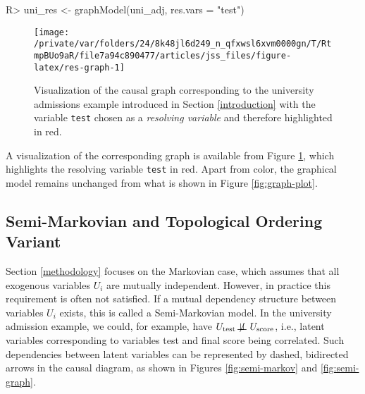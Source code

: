 \documentclass[
  nojss]{jss}
\begin{document}
\begin{CodeChunk}
\begin{CodeInput}
R> uni_res <- graphModel(uni_adj, res.vars = "test")
\end{CodeInput}
\end{CodeChunk}

\begin{CodeChunk}
\begin{figure}

{\centering \texttt{[image: /private/var/folders/24/8k48jl6d249\_n\_qfxwsl6xvm0000gn/T/RtmpBUo9aR/file7a94c890477/articles/jss\_files/figure-latex/res-graph-1]} 

}

\caption[Visualization of the causal graph corresponding to the university admissions example introduced in Section \ref{introduction} with the variable \texttt{test} chosen as a \textit{resolving variable} and therefore highlighted in red]{Visualization of the causal graph corresponding to the university admissions example introduced in Section \ref{introduction} with the variable \texttt{test} chosen as a \textit{resolving variable} and therefore highlighted in red.}\label{fig:res-graph}
\end{figure}
\end{CodeChunk}

A visualization of the corresponding graph is available from Figure
\ref{fig:res-graph}, which highlights the resolving variable
\texttt{test} in red. Apart from color, the graphical model remains
unchanged from what is shown in Figure \ref{fig:graph-plot}.

\hypertarget{semi-markovian-and-topological-ordering-variant}{%
\subsection{Semi-Markovian and Topological Ordering
Variant}\label{semi-markovian-and-topological-ordering-variant}}

Section \ref{methodology} focuses on the Markovian case, which assumes
that all exogenous variables \(U_i\) are mutually independent. However,
in practice this requirement is often not satisfied. If a mutual
dependency structure between variables \(U_i\) exists, this is called a
Semi-Markovian model. In the university admission example, we could, for
example, have
\(U_{\text{test}} \not\!\perp\!\!\!\perp U_{\text{score}}\), i.e.,
latent variables corresponding to variables test and final score being
correlated. Such dependencies between latent variables can be
represented by dashed, bidirected arrows in the causal diagram, as shown
in Figures \ref{fig:semi-markov} and \ref{fig:semi-graph}.
\end{document}
